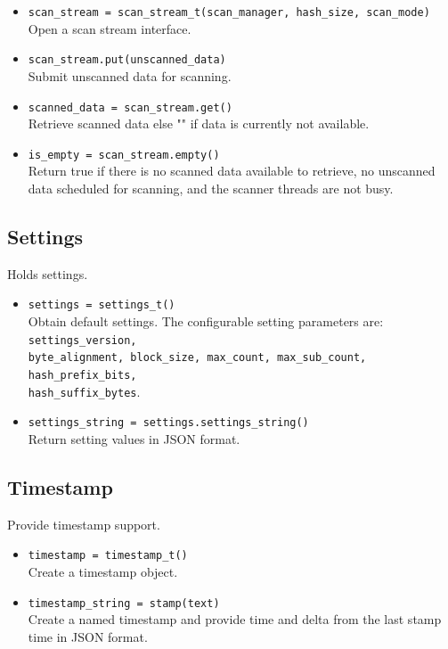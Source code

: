 \documentclass[11pt,fleqn]{article} %
\begin{document}
\begin{itemize}
\item \verb+scan_stream = scan_stream_t(scan_manager, hash_size, scan_mode)+\\
Open a scan stream interface.
\item \verb+scan_stream.put(unscanned_data)+\\
Submit unscanned data for scanning.
\item \verb+scanned_data = scan_stream.get()+\\
Retrieve scanned data else "" if data is currently not available.
\item \verb+is_empty = scan_stream.empty()+\\
Return true if there is no scanned data available to retrieve, no unscanned data scheduled for scanning, and the scanner threads are not busy.
\end{itemize}

\subsection{Settings}
Holds \hdb settings.

\begin{itemize}
\item \verb+settings = settings_t()+\\
Obtain default settings. The configurable setting parameters are: \verb+settings_version,+\\
\verb+byte_alignment, block_size, max_count, max_sub_count, hash_prefix_bits,+\\
\verb+hash_suffix_bytes+.
\item \verb+settings_string = settings.settings_string()+\\
Return setting values in JSON format.
\end{itemize}

\subsection{Timestamp}
Provide timestamp support.

\begin{itemize}
\item \verb+timestamp = timestamp_t()+\\
Create a timestamp object.
\item \verb+timestamp_string = stamp(text)+\\
Create a named timestamp and provide time and delta from the last stamp time in JSON format.
\end{itemize}
\end{document}
